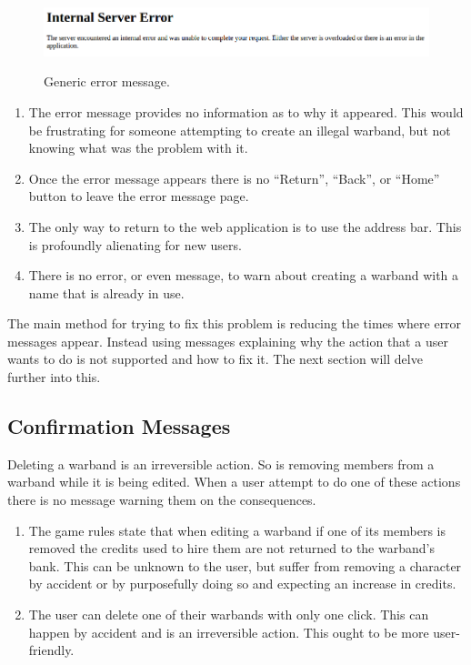 \documentclass[12pt,a4paper]{article}
\begin{document}
\begin{figure}[h]
 \centering
 \includegraphics[width=1\textwidth]{img/warband_error}
 \label{fig:1}
 \caption{Generic error message.}
\end{figure}

\begin{enumerate}
 \item The error message provides no information as to why it appeared. This would be frustrating for someone attempting to create an illegal warband, but not knowing what was the problem with it. 
 \item Once the error message appears there is no ``Return'', ``Back'', or ``Home'' button to leave the error message page. 
 \item The only way to return to the web application is to use the address bar. This is profoundly alienating for new users.
 \item There is no error, or even message, to warn about creating a warband with a name that is already in use. 
\end{enumerate}

The main method for trying to fix this problem is reducing the times where error messages appear. Instead using messages explaining why the action that a user wants to do is not supported and how to fix it. The next section will delve further into this.

\subsection{Confirmation Messages}

Deleting a warband is an irreversible action. So is removing members from a warband while it is being edited. When a user attempt to do one of these actions there is no message warning them on the consequences. 

\begin{enumerate}
 \item The game rules state that when editing a warband if one of its members is removed the credits used to hire them are not returned to the warband's bank. This can be unknown to the user, but suffer from removing a character by accident or by purposefully doing so and expecting an increase in credits.
 \item The user can delete one of their warbands with only one click. This can happen by accident and is an irreversible action. This ought to be more user-friendly.
\end{enumerate}
\end{document}
